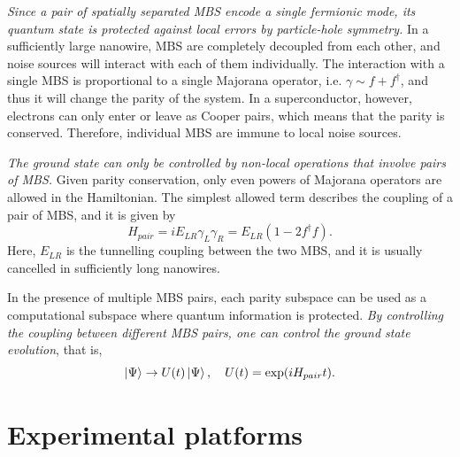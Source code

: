 \textit{Since a pair of spatially separated MBS encode a single fermionic mode, its quantum state is protected against local errors by particle-hole symmetry.}
In a sufficiently large nanowire, MBS are completely decoupled from each other, and noise sources will interact with each of them individually.
The interaction with a single MBS is proportional to a single Majorana operator, i.e. $\gamma \sim f + f^{\dagger}$, and thus it will change the parity of the system.
In a superconductor, however, electrons can only enter or leave as Cooper pairs, which means that the parity is conserved. 
Therefore, individual MBS are immune to local noise sources.

\textit{The ground state can only be controlled by non-local operations that involve pairs of MBS.}
Given parity conservation, only even powers of Majorana operators are allowed in the Hamiltonian.
The simplest allowed term describes the coupling of a pair of MBS, and it is given by
\begin{equation}
H_{pair} = i E_{LR} \gamma_{L} \gamma_{R} = E_{LR} (1 - 2 f^{\dagger} f).
\end{equation}
Here, $E_{LR}$ is the tunnelling coupling between the two MBS, and it is usually cancelled in sufficiently long nanowires.

In the presence of multiple MBS pairs, each parity subspace can be used as a computational subspace where quantum information is protected.
\textit{By controlling the coupling between different MBS pairs, one can control the ground state evolution}, that is,
\begin{equation}
\ket{\Psi} \rightarrow U(t)\ket{\Psi}, \quad U(t) = \exp(iH_{pair} t).
\end{equation}

\section{Experimental platforms}

